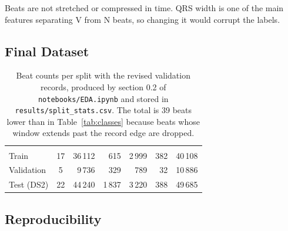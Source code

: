 Beats are not stretched or compressed in time. QRS width is one of the main features separating V from N beats, so changing it would corrupt the labels.

\subsection{Final Dataset}

\begin{table}[H]
  \centering
  \caption{Beat counts per split with the revised validation records, produced by section 0.2 of \texttt{notebooks/EDA.ipynb} and stored in \texttt{results/split\_stats.csv}. The total is 39 beats lower than in Table~\ref{tab:classes} because beats whose window extends past the record edge are dropped.}
  \label{tab:final-dataset}
  \begin{tabularx}{\linewidth}{l c R R R R R}
     &  &  &  &  &  &  \\
    Train & 17 & 36\,112 & 615 & 2\,999 & 382 & 40\,108 \\
    Validation & 5 & 9\,736 & 329 & 789 & 32 & 10\,886 \\
    Test (DS2) & 22 & 44\,240 & 1\,837 & 3\,220 & 388 & 49\,685 \\
    \bottomrule
  \end{tabularx}

\end{table}

\subsection{Reproducibility}

